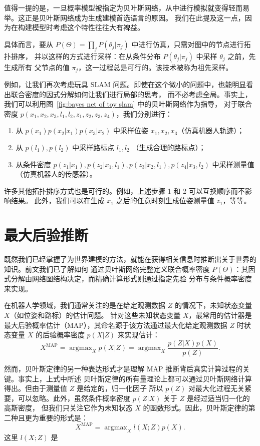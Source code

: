 \documentclass[fontset=none]{Notes}
\DeclareMathOperator*\argmax{argmax}
\begin{document}
值得一提的是，一旦概率模型被指定为贝叶斯网络，从中进行模拟就变得轻而易举。这正是贝叶斯网络成为生成建模首选语言的原因。
我们在此提及这一点，因为在构建模型时考虑这个特性往往大有裨益。

具体而言，要从 $P(\Theta) =\prod_j  P(\theta_j |\pi_j )$ 中进行仿真，只需对图中的节点进行拓扑排序，
并以这样的方式进行采样：在从条件分布 $P(\theta_j |\pi_j )$ 中采样 $\theta_j$ 之前，先生成所有
父节点的值 $\pi_j$，这一过程总是可行的。该技术被称为祖先采样。

例如，让我们再次考虑玩具 SLAM 问题。即使在这个微小的问题中，也能明显看出联合密度的因式分解如何让我们进行局部的思考，
而不必考虑全局。事实上，我们可以利用图~\ref{fig:bayes net of toy slam} 中的贝叶斯网络作为指导，
对于联合密度 $p(x_1, x_2, x_3, l_1, l_2, z_1, z_2, z_3, z_4)$，我们分别进行：
\begin{enumerate}
  \item 从 $p(x_1)p(x_2|x_1)p(x_3|x_2)$ 中采样位姿 $x_1,x_2,x_3$（仿真机器人轨迹）；
  \item 从 $p(l_1),p(l_2)$ 中采样路标点 $l_1,l_2$ （生成合理的路标点）；
  \item 从条件密度 $p(z_1|x_1),p(z_2|x_1,l_1),p(z_3|x_2,l_1),p(z_4|x_3,l_2)$ 中采样测量值
  （仿真机器人的传感器）。
\end{enumerate}
许多其他拓扑排序方式也是可行的。例如，上述步骤 1 和 2 可以互换顺序而不影响结果。
此外，我们可以在生成 $x_1$ 之后的任意时刻生成位姿测量值 $z_1$，等等。

\section{最大后验推断}

既然我们已经掌握了为世界建模的方法，就能在获得相关信息时推断出关于世界的知识。前文我们已了解如何
通过贝叶斯网络完整定义联合概率密度 $P(\Theta)$：其因式分解由网络图结构决定，而精确计算形式则通过指定先验
分布与条件概率密度来实现。

在机器人学领域，我们通常关注的是在给定观测数据 $Z$ 的情况下，未知状态变量 $X$（如位姿和路标）的估计问题。
针对这些未知状态变量 $X$，最常用的估计器是最大后验概率估计（MAP），其命名源于该方法通过最大化给定观测数据
$Z$ 时状态变量 $X$ 的后验概率密度 $p(X|Z)$ 来实现估计：
\[
  X^{\mathrm{MAP}}=\argmax_X p(X|Z)=\argmax_X\frac{p(Z|X)p(X)}{p(Z)}.
\]

然而，贝叶斯定律的另一种表达形式才是理解 MAP 推断背后真实计算过程的关键。事实上，上式中所述
贝叶斯定律的所有量理论上都可以通过贝叶斯网络计算得出。但由于测量值 $Z$ 是给定的，归一化因子
所以 $p(Z)$ 对最大化过程无关紧要，可以忽略。此外，虽然条件概率密度 $p(Z|X)$ 关于 $Z$ 是经过适当归一化的高斯密度，
但我们只关注它作为未知状态 $X$ 的函数形式。因此，贝叶斯定律的第二种且更为重要的形式是：
\[
  X^{\mathrm{MAP}}=\argmax_X l(X;Z) p(X).
\]
这里 $l(X;Z)$ 是
\end{document}
